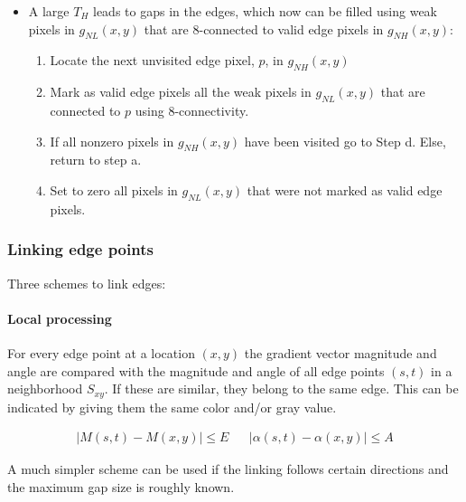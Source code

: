 \begin{enumerate}
\begin{itemize}
			\item A large $T_H$ leads to gaps in the edges, which now can be filled using weak pixels in $g_{NL}(x,y)$ that are 8-connected to valid edge pixels in $g_{NH}(x,y)$:
				\begin{enumerate}
					\item Locate the next unvisited edge pixel, $p$, in $g_{NH}(x,y)$
					\item Mark as valid edge pixels all the weak pixels in $g_{NL}(x,y)$ that are connected to $p$ using 8-connectivity.
					\item If all nonzero pixels in $g_{NH}(x,y)$ have been visited go to Step d. Else, return to step a.
					\item Set to zero all pixels in $g_{NL}(x,y)$ that were not marked as valid edge pixels.
				\end{enumerate}
		\end{itemize}
\end{enumerate}


\subsubsection{Linking edge points}
Three schemes to link edges:\\
\paragraph{Local processing}
For every edge point at a location $(x,y)$ the gradient vector magnitude and angle are compared with the magnitude and angle of all edge points $(s,t)$ in a neighborhood $S_{xy}$. If these are similar, they belong to the same edge. This can be indicated by giving them the same color and/or gray value.

\begin{align*}
	\left| M(s,t) - M(x,y) \right| \leq E && \left| \alpha(s,t) - \alpha(x,y) \right| \leq A
\end{align*}

A much simpler scheme can be used if the linking follows certain directions and the maximum gap size is roughly known.\\

